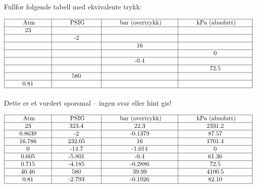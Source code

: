 

Fullfor folgende tabell med ekvivalente trykk:


$$\vbox{\offinterlineskip
\halign{\strut
\vrule \quad\hfil # \ \hfil & 
\vrule \quad\hfil # \ \hfil & 
\vrule \quad\hfil # \ \hfil & 
\vrule \quad\hfil # \ \hfil \vrule \cr
\noalign{\hrule}
%
\hskip 20pt Atm \hskip 20pt & \hskip 20pt PSIG \hskip 20pt & \hskip 20pt bar (overtrykk) \hskip 20pt & \hskip 20pt kPa (absolutt) \hskip 20pt \cr
%
\noalign{\hrule}
%
23 &  &  &  \cr
%
\noalign{\hrule}
%
  & -2 &  &  \cr
%
\noalign{\hrule}
%
  &  & 16 &  \cr
%
\noalign{\hrule}
%
  &  &  & 0 \cr
%
\noalign{\hrule}
%
  &  & -0.4 &  \cr
%
\noalign{\hrule}
%
  &  &  & 72.5 \cr
%
\noalign{\hrule}
%
  & 580 &  &  \cr
%
\noalign{\hrule}
%
0.81 &  &  &  \cr
%
\noalign{\hrule}
} %
}$$ %


\vfil 

\eject






Dette er et vurdert sporsmal -- ingen svar eller hint gis!








$$\vbox{\offinterlineskip
\halign{\strut
\vrule \quad\hfil # \ \hfil & 
\vrule \quad\hfil # \ \hfil & 
\vrule \quad\hfil # \ \hfil & 
\vrule \quad\hfil # \ \hfil \vrule \cr
\noalign{\hrule}
%
\hskip 20pt Atm \hskip 20pt & \hskip 20pt PSIG \hskip 20pt & \hskip 20pt bar (overtrykk) \hskip 20pt & \hskip 20pt kPa (absolutt) \hskip 20pt \cr
%
\noalign{\hrule}
%
23 & 323.4 & 22.3 & 2331.2 \cr
%
\noalign{\hrule}
%
0.8639 & -2 & -0.1379 & 87.57 \cr
%
\noalign{\hrule}
%
16.786 & 232.05 & 16 & 1701.4 \cr
%
\noalign{\hrule}
%
0 & -14.7 & -1.014 & 0 \cr
%
\noalign{\hrule}
%
0.605 & -5.801 & -0.4 & 61.36 \cr
%
\noalign{\hrule}
%
0.715 & -4.185 & -0.2886 & 72.5 \cr
%
\noalign{\hrule}
%
40.46 & 580 & 39.99 & 4100.5 \cr
%
\noalign{\hrule}
%
0.81 & -2.793 & -0.1926 & 82.10 \cr
%
\noalign{\hrule}
} %
}$$ %





